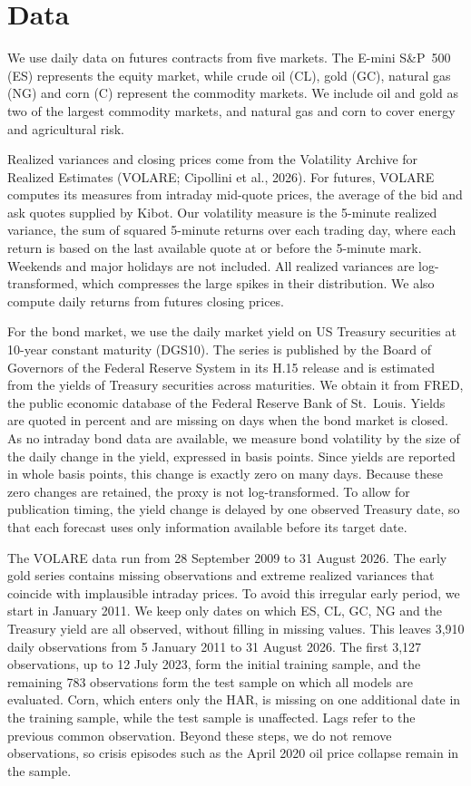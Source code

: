\documentclass{report}
\begin{document}
\chapter{Data}
\label{sec:data}

We use daily data on futures contracts from five markets. The E-mini S\&P~500 (ES) represents the equity market, while crude oil (CL), gold (GC), natural gas (NG) and corn (C) represent the commodity markets. We include oil and gold as two of the largest commodity markets, and natural gas and corn to cover energy and agricultural risk.

\vspace{1em}

Realized variances and closing prices come from the Volatility Archive for Realized Estimates (VOLARE; Cipollini et al., 2026). For futures, VOLARE computes its measures from intraday mid-quote prices, the average of the bid and ask quotes supplied by Kibot. Our volatility measure is the 5-minute realized variance, the sum of squared 5-minute returns over each trading day, where each return is based on the last available quote at or before the 5-minute mark. Weekends and major holidays are not included. All realized variances are log-transformed, which compresses the large spikes in their distribution. We also compute daily returns from futures closing prices.

For the bond market, we use the daily market yield on US Treasury securities at 10-year constant maturity (DGS10). The series is published by the Board of Governors of the Federal Reserve System in its H.15 release and is estimated from the yields of Treasury securities across maturities. We obtain it from FRED, the public economic database of the Federal Reserve Bank of St.~Louis. Yields are quoted in percent and are missing on days when the bond market is closed. As no intraday bond data are available, we measure bond volatility by the size of the daily change in the yield, expressed in basis points. Since yields are reported in whole basis points, this change is exactly zero on many days. Because these zero changes are retained, the proxy is not log-transformed. To allow for publication timing, the yield change is delayed by one observed Treasury date, so that each forecast uses only information available before its target date.

The VOLARE data run from 28 September 2009 to 31 August 2026. The early gold series contains missing observations and extreme realized variances that coincide with implausible intraday prices. To avoid this irregular early period, we start in January 2011. We keep only dates on which ES, CL, GC, NG and the Treasury yield are all observed, without filling in missing values. This leaves 3,910 daily observations from 5 January 2011 to 31 August 2026. The first 3,127 observations, up to 12 July 2023, form the initial training sample, and the remaining 783 observations form the test sample on which all models are evaluated. Corn, which enters only the HAR, is missing on one additional date in the training sample, while the test sample is unaffected. Lags refer to the previous common observation. Beyond these steps, we do not remove observations, so crisis episodes such as the April 2020 oil price collapse remain in the sample.
\end{document}
